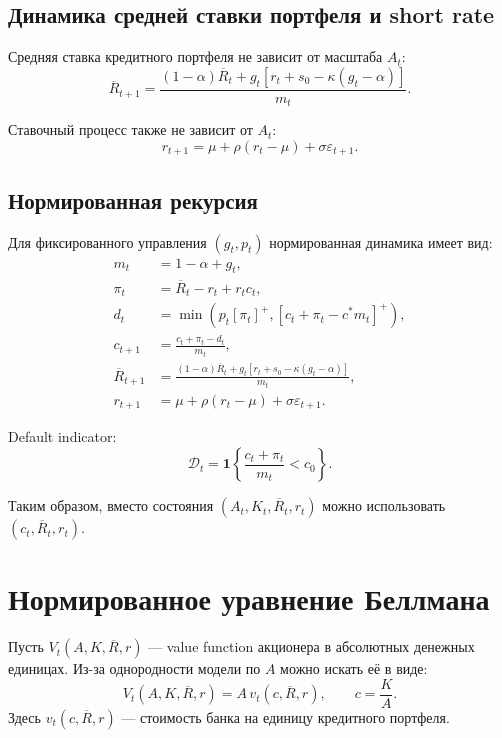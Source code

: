 \documentclass[11pt,a4paper]{article}
\newcommand{\1}{\mathbf{1}}
\newcommand{\pos}[1]{\left[#1\right]^+}
\begin{document}
\subsection{Динамика средней ставки портфеля и short rate}

Средняя ставка кредитного портфеля не зависит от масштаба $A_t$:
\begin{equation}
    \boxed{
    \overline{R}_{t+1}
    =
    \frac{(1-\alpha)\overline{R}_t+g_t\left[r_t+s_0-\kappa(g_t-\alpha)\right]}{m_t}.
    }
\end{equation}

Ставочный процесс также не зависит от $A_t$:
\begin{equation}
    \boxed{
    r_{t+1}=\mu+\rho(r_t-\mu)+\sigma\varepsilon_{t+1}.
    }
\end{equation}

\subsection{Нормированная рекурсия}

Для фиксированного управления $(g_t,p_t)$ нормированная динамика имеет вид:
\begin{align}
    m_t &= 1-\alpha+g_t,\\
    \pi_t &= \overline{R}_t-r_t+r_tc_t,\\
    d_t &= \min\left(p_t\pos{\pi_t},\pos{c_t+\pi_t-c^*m_t}\right),\\
    c_{t+1} &= \frac{c_t+\pi_t-d_t}{m_t},\\
    \overline{R}_{t+1} &= \frac{(1-\alpha)\overline{R}_t+g_t\left[r_t+s_0-\kappa(g_t-\alpha)\right]}{m_t},\\
    r_{t+1} &= \mu+\rho(r_t-\mu)+\sigma\varepsilon_{t+1}.
\end{align}

Default indicator:
\begin{equation}
    \mathcal{D}_t=
    \1\left\{\frac{c_t+\pi_t}{m_t}<c_0\right\}.
\end{equation}

Таким образом, вместо состояния $(A_t,K_t,\overline{R}_t,r_t)$ можно использовать $(c_t,\overline{R}_t,r_t)$.

\section{Нормированное уравнение Беллмана}

Пусть $V_t(A,K,\overline{R},r)$ --- value function акционера в абсолютных денежных единицах. Из-за однородности модели по $A$ можно искать её в виде:
\begin{equation}
    \boxed{
    V_t(A,K,\overline{R},r)=A\,v_t(c,\overline{R},r),
    \qquad c=\frac{K}{A}.
    }
\end{equation}
Здесь $v_t(c,\overline{R},r)$ --- стоимость банка на единицу кредитного портфеля.
\end{document}
